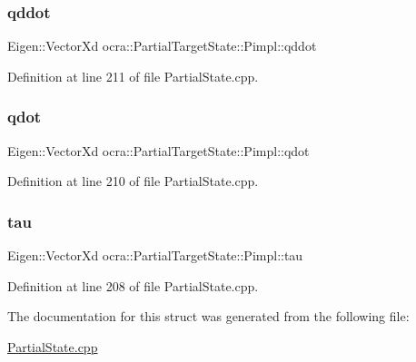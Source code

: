 \subsubsection{\texorpdfstring{qddot}{qddot}}
{\footnotesize\ttfamily Eigen\+::\+Vector\+Xd ocra\+::\+Partial\+Target\+State\+::\+Pimpl\+::qddot}



Definition at line 211 of file Partial\+State.\+cpp.

\hypertarget{structocra_1_1PartialTargetState_1_1Pimpl_a788a4c8818c07f7cd401d3a7cf1cf5c4}{}\label{structocra_1_1PartialTargetState_1_1Pimpl_a788a4c8818c07f7cd401d3a7cf1cf5c4} 
\subsubsection{\texorpdfstring{qdot}{qdot}}
{\footnotesize\ttfamily Eigen\+::\+Vector\+Xd ocra\+::\+Partial\+Target\+State\+::\+Pimpl\+::qdot}



Definition at line 210 of file Partial\+State.\+cpp.

\hypertarget{structocra_1_1PartialTargetState_1_1Pimpl_a68194144a3fdbdb73744178332101ed0}{}\label{structocra_1_1PartialTargetState_1_1Pimpl_a68194144a3fdbdb73744178332101ed0} 
\subsubsection{\texorpdfstring{tau}{tau}}
{\footnotesize\ttfamily Eigen\+::\+Vector\+Xd ocra\+::\+Partial\+Target\+State\+::\+Pimpl\+::tau}



Definition at line 208 of file Partial\+State.\+cpp.



The documentation for this struct was generated from the following file\+:\begin{DoxyCompactItemize}
\item 
\hyperlink{PartialState_8cpp}{Partial\+State.\+cpp}\end{DoxyCompactItemize}
